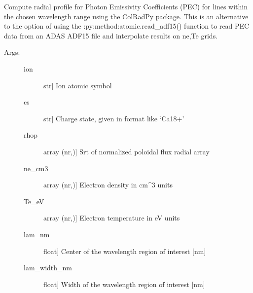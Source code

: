 \documentclass[letterpaper,10pt,english]{sphinxmanual}
\begin{document}
\begin{fulllineitems}
\label{\detokenize{aurora:aurora.radiation.get_pec_prof}}
Compute radial profile for Photon Emissivity Coefficients (PEC) for lines within the chosen
wavelength range using the ColRadPy package. This is an alternative to the option of using 
the :py:method:atomic.read\_adf15() function to read PEC data from an ADAS ADF\sphinxhyphen{}15 file and 
interpolate results on ne,Te grids.
\begin{description}
\item[{Args:}] \leavevmode\begin{description}
\item[{ion}] \leavevmode{[}str{]}
Ion atomic symbol

\item[{cs}] \leavevmode{[}str{]}
Charge state, given in format like ‘Ca18+’

\item[{rhop}] \leavevmode{[}array (nr,){]}
Srt of normalized poloidal flux radial array

\item[{ne\_cm3}] \leavevmode{[}array (nr,){]}
Electron density in cm\textasciicircum{}\sphinxhyphen{}3 units

\item[{Te\_eV}] \leavevmode{[}array (nr,){]}
Electron temperature in eV units

\item[{lam\_nm}] \leavevmode{[}float{]}
Center of the wavelength region of interest {[}nm{]}

\item[{lam\_width\_nm}] \leavevmode{[}float{]}
Width of the wavelength region of interest {[}nm{]}


\end{description}
\end{description}
\end{fulllineitems}
\end{document}
